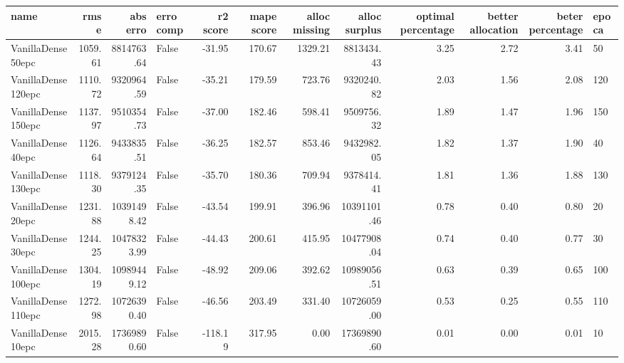 \begin{tabular}{lrrlrrrrrrrl}
\toprule
name & rmse & abs erro & erro comp & r2 score & mape score & alloc missing & alloc surplus & optimal percentage & better allocation & beter percentage & epoca \\
\midrule
VanillaDense50epc & 1059.61 & 8814763.64 & False & -31.95 & 170.67 & 1329.21 & 8813434.43 & 3.25 & 2.72 & 3.41 & 50 \\
VanillaDense120epc & 1110.72 & 9320964.59 & False & -35.21 & 179.59 & 723.76 & 9320240.82 & 2.03 & 1.56 & 2.08 & 120 \\
VanillaDense150epc & 1137.97 & 9510354.73 & False & -37.00 & 182.46 & 598.41 & 9509756.32 & 1.89 & 1.47 & 1.96 & 150 \\
VanillaDense40epc & 1126.64 & 9433835.51 & False & -36.25 & 182.57 & 853.46 & 9432982.05 & 1.82 & 1.37 & 1.90 & 40 \\
VanillaDense130epc & 1118.30 & 9379124.35 & False & -35.70 & 180.36 & 709.94 & 9378414.41 & 1.81 & 1.36 & 1.88 & 130 \\
VanillaDense20epc & 1231.88 & 10391498.42 & False & -43.54 & 199.91 & 396.96 & 10391101.46 & 0.78 & 0.40 & 0.80 & 20 \\
VanillaDense30epc & 1244.25 & 10478323.99 & False & -44.43 & 200.61 & 415.95 & 10477908.04 & 0.74 & 0.40 & 0.77 & 30 \\
VanillaDense100epc & 1304.19 & 10989449.12 & False & -48.92 & 209.06 & 392.62 & 10989056.51 & 0.63 & 0.39 & 0.65 & 100 \\
VanillaDense110epc & 1272.98 & 10726390.40 & False & -46.56 & 203.49 & 331.40 & 10726059.00 & 0.53 & 0.25 & 0.55 & 110 \\
VanillaDense10epc & 2015.28 & 17369890.60 & False & -118.19 & 317.95 & 0.00 & 17369890.60 & 0.01 & 0.00 & 0.01 & 10 \\
\bottomrule
\end{tabular}
